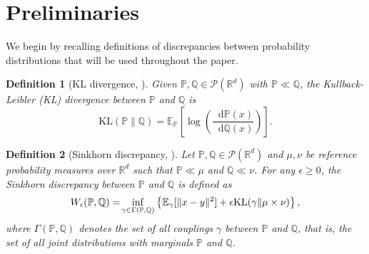 \documentclass[letterpaper, 10 pt, conference]{ieeeconf}  %
\theoremstyle{ieeeconf}
\newtheorem{definition}{Definition}
\newcommand{\R}{\mathbb{R}}
\newcommand{\Prob}{\mathbb{P}}
\newcommand{\E}{\mathbb{E}}
\newcommand{\Q}{\mathbb{Q}}
\newcommand{\dd}{\mathop{}\!\mathrm{d}}
\begin{document}

% 
% 
% 
% 
\section{Preliminaries}
We begin by recalling definitions of discrepancies between probability distributions that will be used throughout the paper.
\begin{definition}[KL divergence, {\cite[Definition 2.8]{kuhn2025distributionally}}]
Given $\Prob, \Q\in\mathcal{P}(\R^d)$ with $\Prob\ll \Q$, the Kullback-Leibler (KL) divergence between $\Prob$ and $\Q$ is
    \begin{equation*}
    \mathrm{KL}(\Prob\|\Q) = \E_\Prob\left[\log\left(\frac{\dd\Prob(x)}{\dd\Q(x)}\right)\right].
\end{equation*}
\end{definition}
\begin{definition}[Sinkhorn discrepancy, {\cite[Definition 1]{sinkhorn}}]
Let $\Prob, \Q\in\mathcal{P}(\R^d)$ and $\mu, \nu$ be reference probability measures over $\R^d$ 
such that $\Prob \ll \mu$ and $\Q \ll \nu$. For any $\epsilon \geq 0$, the Sinkhorn discrepancy 
between $\Prob$ and $\Q$ is defined as
\begin{equation}
\label{eq:sinkhorn}
    W_{\epsilon}(\Prob, \Q) = \! \inf_{\gamma \in \Gamma(\Prob, \Q)}\left\{\E_\gamma [\|x-y\|^2] + \\ 
    \epsilon \mathrm{KL}(\gamma\|\mu\times\nu )\right\},
\end{equation}
where $\Gamma(\Prob, \Q)$ denotes the set of all couplings $\gamma$ between $\Prob$ and $\Q$, that is, the set of all joint distributions with marginals $\Prob$ and $\Q$.
\end{definition}
\end{document}
